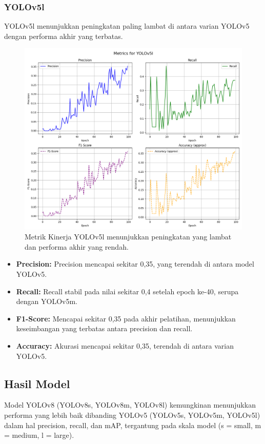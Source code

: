 \documentclass[12pt,a4paper]{article}
\begin{document}
\subsubsection{YOLOv5l}
YOLOv5l menunjukkan peningkatan paling lambat di antara varian YOLOv5 dengan performa akhir yang terbatas.

\begin{figure}[H]
    \centering
    \includegraphics[width=0.6\linewidth]{assets/yolov5l_metrics.png}
    \caption{Metrik Kinerja YOLOv5l menunjukkan peningkatan yang lambat dan performa akhir yang rendah.}
    \label{fig:yolov5l}
\end{figure}

\begin{itemize}
    \item \textbf{Precision:} Precision mencapai sekitar 0,35, yang terendah di antara model YOLOv5.
    \item \textbf{Recall:} Recall stabil pada nilai sekitar 0,4 setelah epoch ke-40, serupa dengan YOLOv5m.
    \item \textbf{F1-Score:} Mencapai sekitar 0,35 pada akhir pelatihan, menunjukkan keseimbangan yang terbatas antara precision dan recall.
    \item \textbf{Accuracy:} Akurasi mencapai sekitar 0,35, terendah di antara varian YOLOv5.
\end{itemize}

\subsection{Hasil Model}

Model YOLOv8 (YOLOv8s, YOLOv8m, YOLOv8l) kemungkinan menunjukkan performa yang lebih baik dibanding YOLOv5 (YOLOv5s, YOLOv5m, YOLOv5l) dalam hal precision, recall, dan mAP, tergantung pada skala model (s = small, m = medium, l = large).
\end{document}
